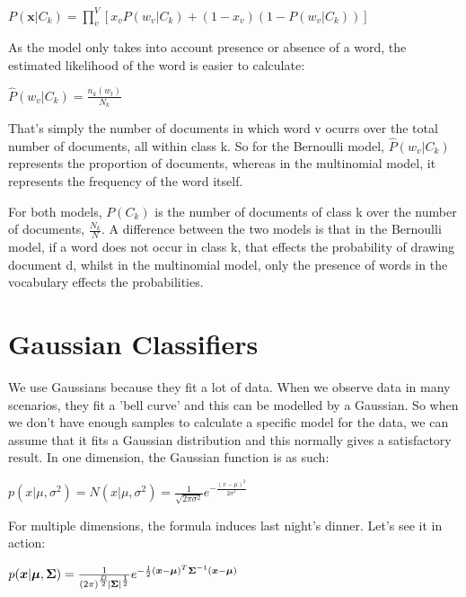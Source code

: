 \documentclass[10pt,a4paper]{article}
\begin{document}
		\begin{center}
			$
			P(\bm x|C_k) = \prod\limits_v^V \left[ x_vP(w_v|C_k) + (1-x_v)(1-P(w_v|C_k))\right] 
			$
		\end{center}
		As the model only takes into account presence or absence of a word, the estimated likelihood of the word is easier to calculate:
		
		\begin{center}
			$ \hat{P}(w_v|C_k) = \frac{n_k(w_t)}{N_k} $
		\end{center}
		That's simply the number of documents in which word v ocurrs over the total number of documents, all within class k. So for the Bernoulli model,  $\hat{P}(w_v|C_k)$ represents the proportion of documents, whereas in the multinomial model, it represents the frequency of the word itself.
		
		For both models, $P(C_k)$ is the number of documents of class k over the number of documents, $\frac{N_k}{N}$.
		A difference between the two models is that in the Bernoulli model, if a word does not occur in class k, that effects the probability of drawing document d, whilst in the multinomial model, only the presence of words in the vocabulary effects the probabilities.
		
	
	
	\section{Gaussian Classifiers}
	
	We use Gaussians because they fit a lot of data. When we observe data in many scenarios, they fit a 'bell curve' and this can be modelled by a Gaussian. So when we don't have enough samples to calculate a specific model for the data, we can assume that it fits a Gaussian distribution and this normally gives a satisfactory result.
	In one dimension, the Gaussian function is as such:
	
	\begin{center}
	\Large 	$
			p(x|\mu, \sigma^2) = 
			N(x|\mu, \sigma^2) =
			\frac{1}{\sqrt{ 2\pi\sigma^2}}  e^{-\frac{(x-\mu)^2}{2\sigma^2}}
		$
	\end{center}
	
	For multiple dimensions, the formula induces last night's dinner. Let's see it in action:
	
		\begin{center}
			\LARGE 
			$
			p(\bm x| \bm \mu,\bm \Sigma) = 
			\frac{1}{
				(2\pi)^{\frac{D}{2}}
				\abs{\bm \Sigma}^{\frac{1}{2}}
			}{
				e^{
					-\frac{1}{2}
					(\bm x - \bm \mu)^T
					\bm \Sigma^{-1}
					(\bm x - \bm \mu)	
				}
			}
			$
		\end{center}
		
\end{document}
